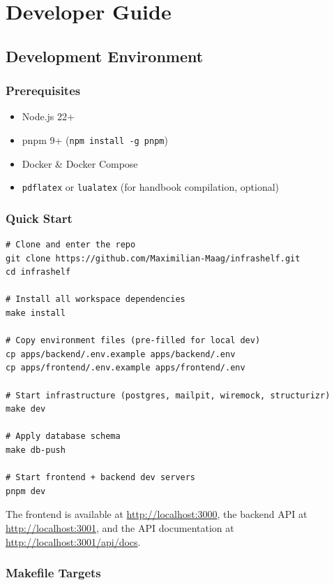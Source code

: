 \documentclass[12pt,a4paper,twoside]{report}
\newcommand{\code}[1]{\texttt{#1}}
\begin{document}
\part{Developer Guide}
\label{part:dev}

\chapter{Development Environment}
\label{ch:devenv}

\section{Prerequisites}

\begin{itemize}
  \item Node.js 22+
  \item pnpm 9+ (\code{npm install -g pnpm})
  \item Docker \& Docker Compose
  \item \code{pdflatex} or \code{lualatex} (for handbook compilation, optional)
\end{itemize}

\section{Quick Start}

\begin{lstlisting}[style=bash]
# Clone and enter the repo
git clone https://github.com/Maximilian-Maag/infrashelf.git
cd infrashelf

# Install all workspace dependencies
make install

# Copy environment files (pre-filled for local dev)
cp apps/backend/.env.example apps/backend/.env
cp apps/frontend/.env.example apps/frontend/.env

# Start infrastructure (postgres, mailpit, wiremock, structurizr)
make dev

# Apply database schema
make db-push

# Start frontend + backend dev servers
pnpm dev
\end{lstlisting}

The frontend is available at \url{http://localhost:3000}, the backend API at
\url{http://localhost:3001}, and the API documentation at
\url{http://localhost:3001/api/docs}.

\section{Makefile Targets}
\end{document}
